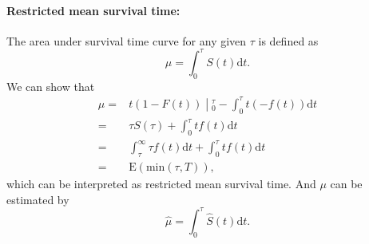 \documentclass[a4paper,12pt]{article}
\begin{document}
\paragraph{Restricted mean survival time: }

The area under survival time curve for any given $\tau$ is defined as
\[
  \mu = \int_0^\tau S\left(t\right)\mathrm{d}t.
\]
We can show that
\[
  \begin{aligned}
    \mu =&
    \left.
      t\left(1 - F\left(t\right)\right)\middle|_0^\tau
    \right.
    - \int_0^\tau t\left(-f\left(t\right)\right)\mathrm{d}t    \\
    =& \tau S\left(\tau\right) + \int_0^\tau tf\left(t\right)\mathrm{d}t    \\
    =& \int_\tau^\infty \tau f\left(t\right)\mathrm{d}t    
    + \int_0^\tau tf\left(t\right)\mathrm{d}t    \\
    =& \mathrm{E}\left(
      \mathrm{min}\left(\tau, T\right)
    \right)
    ,       
  \end{aligned}
\]
which can be interpreted as restricted mean survival time. And $\mu$ can be estimated by
\[
  \hat{\mu} = \int_0^\tau\hat{S}\left(t\right)\mathrm{d}t
  .
\]




\end{document}
